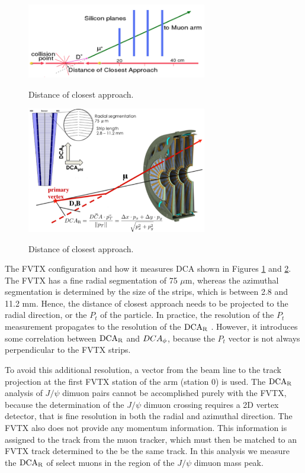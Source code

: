 \documentclass[12pt]{article}
\newcommand{\pt}{$P_{t}$ }
\newcommand{\jpsi}{$J/\psi$ }
\newcommand{\dcar}{$\rm{DCA}_{R}$ }
\begin{document}
\begin{figure}[h]
\begin{center}
\includegraphics[width=0.7\textwidth,angle=0]{figures/DCA}
\\ \caption{Distance of closest approach.}
\label{fig:DCA}
\end{center}
\end{figure}

\begin{figure}[h]
\begin{center}
\includegraphics[width=0.7\textwidth,angle=0]{figures/FVTX_DCA_def}
\\ \caption{Distance of closest approach.}
\label{fig:DCA_2}
\end{center}
\end{figure}


The FVTX configuration and how it measures DCA shown in Figures \ref{fig:DCA} and \ref{fig:DCA_2}. The FVTX has a fine radial segmentation of 75 $\mu$m, 
whereas the azimuthal segmentation is determined by the size of the strips, which is between 2.8 and 11.2 mm. Hence, the distance of closest approach needs 
to be projected to the radial direction, or the \pt of the particle. In practice, the resolution of the \pt measurement propagates to the resolution of the \dcar. 
However, it introduces some correlation between \dcar and $DCA_{\rm \phi}$, because the \pt vector is not always perpendicular to the FVTX strips. 

To avoid this additional resolution, a vector from the beam line to the track projection at the first FVTX station of the arm (station 0) is used.
The \dcar analysis of \jpsi dimuon pairs cannot be accomplished purely with the FVTX, because the determination of the \jpsi dimuon crossing requires a 2D vertex detector, that is fine 
resolution in both the radial and azimuthal direction.  The FVTX also does not provide any momentum information.  This information is assigned to the track from the muon tracker, which 
must then be matched to an FVTX track determined to the be the same track. In this analysis we measure the \dcar of select muons in the region of the \jpsi dimuon mass peak. 
\end{document}
